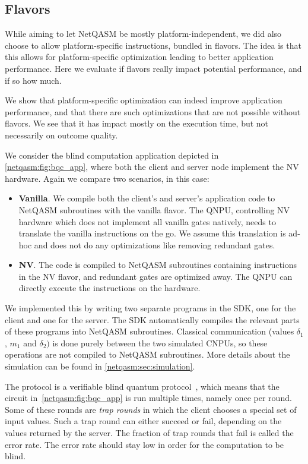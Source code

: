 \subsection{Flavors}
\label{design_decisions_flavors}
While aiming to let \ac{NetQASM} be mostly platform-independent, we did also choose to allow platform-specific instructions, bundled in flavors.
The idea is that this allows for platform-specific optimization leading to better application performance.
Here we evaluate if flavors really impact potential performance, and if so how much.

We show that platform-specific optimization can indeed improve application performance, and that there are such optimizations that are not possible without flavors.
We see that it has impact mostly on the execution time, but not necessarily on outcome quality.

We consider the blind computation application depicted in \cref{netqasm:fig:bqc_app}, where both the client and server node implement the NV hardware.
Again we compare two scenarios, in this case:
\begin{itemize}
  \item \textbf{Vanilla}.
        We compile both the client's and server's application code to \ac{NetQASM} subroutines with the vanilla flavor.
        The \ac{QNPU}, controlling NV hardware which does not implement all vanilla gates natively, needs to translate the vanilla instructions on the go.
        We assume this translation is ad-hoc and does not do any optimizations like removing redundant gates.
  \item \textbf{NV}.
        The code is compiled to \ac{NetQASM} subroutines containing instructions in the NV flavor, and redundant gates are optimized away.
        The \ac{QNPU} can directly execute the instructions on the hardware.
\end{itemize}

We implemented this by writing two separate programs in the SDK, one for the client and one for the server.
The SDK automatically compiles the relevant parts of these programs into \ac{NetQASM} subroutines.
Classical communication (values $\delta_1$, $m_1$ and $\delta_2)$ is done purely between the two simulated \ac{CNPU}s, so these operations are not compiled to \ac{NetQASM} subroutines.
More details about the simulation can be found in \cref{netqasm:sec:simulation}.

The protocol is a verifiable blind quantum protocol~\cite{fitzsimons2017unconditionally}, which means that the circuit in~\cref{netqasm:fig:bqc_app} is run multiple times, namely once per round.
Some of these rounds are \textit{trap rounds} in which the client chooses a special set of input values.
Such a trap round can either succeed or fail, depending on the values returned by the server.
The fraction of trap rounds that fail is called the error rate.
The error rate should stay low in order for the computation to be blind.

